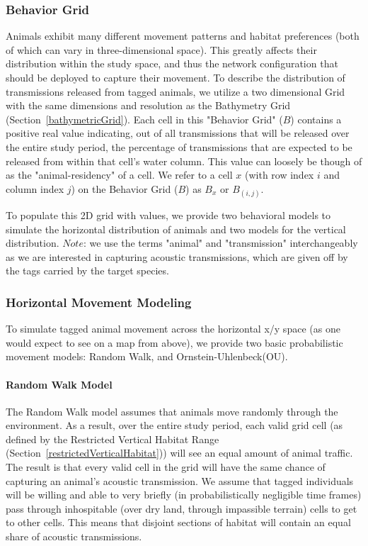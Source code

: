 \subsubsection{Behavior Grid}
\label{behaviorGrid}
Animals exhibit many different movement patterns and habitat preferences (both of which can vary in three-dimensional space).  This greatly affects their distribution within the study space, and thus the network configuration that should be deployed to capture their movement.  To describe the distribution of transmissions released from tagged animals, we utilize a two dimensional Grid with the same dimensions and resolution as the Bathymetry Grid (Section~\ref{bathymetricGrid}).  Each cell in this "Behavior Grid" ($B$) contains a positive real value indicating, out of all transmissions that will be released over the entire study period, the percentage of transmissions that are expected to be released from within that cell's water column.  This value can loosely be though of as the "animal-residency" of a cell.  We refer to a cell $x$ (with row index $i$ and column index $j$) on the Behavior Grid ($B$) as $B_x$ or $B_{(i,j)}$.

To populate this 2D grid with values, we provide two behavioral models to simulate the horizontal distribution of animals and two models for the vertical distribution.  $Note$: we use the terms "animal" and "transmission" interchangeably as we are interested in capturing acoustic transmissions, which are given off by the tags carried by the target species.  


\subsubsection{Horizontal Movement Modeling}
\label{animalMovementModel}
To simulate tagged animal movement across the horizontal x/y space (as one would expect to see on a map from above), we provide two basic probabilistic movement models: Random Walk, and Ornstein-Uhlenbeck(OU).  

\paragraph{Random Walk Model}
\label{randomWalkModel}
The Random Walk model assumes that animals move randomly through the environment.  As a result, over the entire study period, each valid grid cell (as defined by the Restricted Vertical Habitat Range (Section~\ref{restrictedVerticalHabitat})) will see an equal amount of animal traffic.  The result is that every valid cell  in the grid will have the same chance of capturing an animal's acoustic transmission.  We assume that tagged individuals will be willing and able to very briefly (in probabilistically negligible time frames) pass through inhospitable (over dry land, through impassible terrain) cells to get to other cells.  This means that disjoint sections of habitat will contain an equal share of acoustic transmissions.

